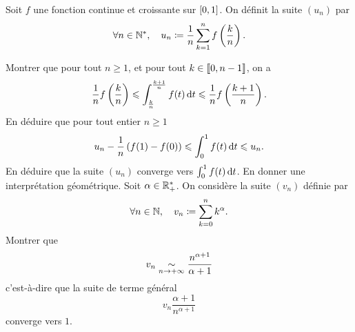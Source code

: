 \documentclass{magnolia}
\begin{document}
Soit $f$ une fonction continue et croissante sur $\left[0,1\right]$. On définit
la suite $(u_n)$ par
$$\forall n\in{\mathbb{N}^*} ,\quad u_n\coloneqq\frac{1}{n}\sum_{k=1}^n f\left(\frac{k}{n}\right).$$
\begin{questions}
\question Montrer que pour tout $n\geq 1$, et pour tout $k\in\left\llbracket 0,n-1\right\rrbracket$, on
  a
  \[\frac{1}{n}f\left(\frac{k}{n}\right)\leqslant\int_{\frac{k}{n}}^{\frac{k+1}{n}} f(t)\,\text{d}t
    \leqslant \frac{1}{n}f\left(\frac{k+1}{n}\right).\]
\question En déduire que pour tout entier $n\geq 1$
  \[u_n-\frac{1}{n}\left(f(1)-f(0)\right) \leqslant \int_{0}^{1} f(t)\,\text{d}t\leqslant u_n.\]
\question En déduire que la suite $(u_n)$ converge vers
  $\int_{0}^{1} f(t)\,\text{d}t$. En donner une interprétation géométrique.
\question Soit $\alpha\in\mathbb{R}_+^*$. On considère la suite $(v_n)$ définie par
  \[\forall n\in\mathbb{N} ,\quad v_n\coloneqq\sum_{k=0}^n k^\alpha.\]
  Montrer que
  \[v_n\underset{n\rightarrow+\infty}{\sim} \frac{n^{\alpha+1}}{\alpha+1}\]
  c'est-à-dire que la suite de terme général
  \[v_n\frac{\alpha+1}{n^{\alpha+1}}\]
  converge vers $1$.
\end{questions}
\end{document}

